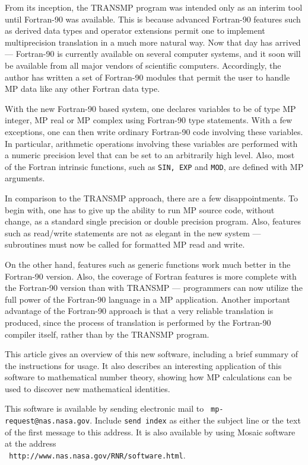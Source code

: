 From its inception, the TRANSMP program was intended only as an
interim tool until Fortran-90 was available.  This is because advanced
Fortran-90 features such as derived data types and operator extensions
permit one to implement multiprecision translation in a much more
natural way.  Now that day has arrived --- Fortran-90 is currently
available on several computer systems, and it soon will be available
from all major vendors of scientific computers.  Accordingly, the
author has written a set of Fortran-90 modules that permit the user to
handle MP data like any other Fortran data type.

With the new Fortran-90 based system, one declares variables to be of
type MP integer, MP real or MP complex using Fortran-90 type
statements.  With a few exceptions, one can then write ordinary
Fortran-90 code involving these variables.  In particular, arithmetic
operations involving these variables are performed with a numeric
precision level that can be set to an arbitrarily high level.  Also,
most of the Fortran intrinsic functions, such as {\tt SIN, EXP} and
{\tt MOD}, are defined with MP arguments.

In comparison to the TRANSMP approach, there are a few
disappointments.  To begin with, one has to give up the ability to run
MP source code, without change, as a standard single precision or
double precision program.  Also, features such as read/write
statements are not as elegant in the new system --- subroutines must
now be called for formatted MP read and write.

On the other hand, features such as generic functions work much better
in the Fortran-90 version.  Also, the coverage of Fortran features is
more complete with the Fortran-90 version than with TRANSMP ---
programmers can now utilize the full power of the Fortran-90 language
in a MP application.  Another important advantage of the Fortran-90
approach is that a very reliable translation is produced, since the
process of translation is performed by the Fortran-90 compiler itself,
rather than by the TRANSMP program.

This article gives an overview of this new software, including a brief
summary of the instructions for usage.  It also describes an
interesting application of this software to mathematical number
theory, showing how MP calculations can be used to discover new
mathematical identities.

This software is available by sending electronic mail to {\tt
mp-request@nas.nasa.gov}.  Include {\tt send index} as either the
subject line or the text of the first message to this address.  It is
also available by using Mosaic software at the address \\ {\tt
http://www.nas.nasa.gov/RNR/software.html}.

